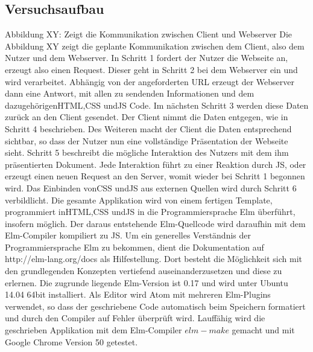 \subsection{Versuchsaufbau}
\label{sec:Versuchsaufbau}
Abbildung XY: Zeigt die Kommunikation zwischen Client und Webserver
Die Abbildung XY zeigt die geplante Kommunikation zwischen dem Client, also dem Nutzer und dem Webserver.
In Schritt 1 fordert der Nutzer die Webseite an, erzeugt also einen Request. Dieser geht in Schritt 2 bei dem Webserver ein und wird verarbeitet. Abhängig von der angeforderten URL erzeugt der Webserver dann eine Antwort, mit allen zu sendenden Informationen und dem dazugehörigen\ac{HTML},\ac{CSS} und\ac{JS} Code. Im nächsten Schritt 3 werden diese Daten zurück an den Client gesendet. Der Client nimmt die Daten entgegen, wie in Schritt 4 beschrieben. Des Weiteren macht der Client die Daten entsprechend sichtbar, so dass der Nutzer nun eine vollständige Präsentation der Webseite sieht. Schritt 5 beschreibt die mögliche Interaktion des Nutzers mit dem ihm präsentierten Dokument. Jede Interaktion führt zu einer Reaktion durch \ac{JS}, oder erzeugt einen neuen Request an den Server, womit wieder bei Schritt 1 begonnen wird. Das Einbinden von\ac{CSS} und\ac{JS} aus externen Quellen wird durch Schritt 6 verbildlicht.
Die gesamte Applikation wird von einem fertigen Template, programmiert in\ac{HTML},\ac{CSS} und\ac{JS} in die Programmiersprache Elm überführt, insofern möglich. Der daraus entstehende Elm-Quellcode wird daraufhin mit dem Elm-Compiler kompiliert zu \ac{JS}.
Um ein generelles Verständnis der Programmiersprache Elm zu bekommen, dient die Dokumentation auf http://elm-lang.org/docs als Hilfestellung. Dort besteht die Möglichkeit sich mit den grundlegenden Konzepten vertiefend auseinanderzusetzen und diese zu erlernen.
Die zugrunde liegende Elm-Version ist 0.17 und wird unter Ubuntu 14.04 64bit installiert. Als Editor wird Atom mit mehreren Elm-Plugins verwendet, so dass der geschriebene Code automatisch beim Speichern formatiert und durch den Compiler auf Fehler überprüft wird.
Lauffähig wird die geschrieben Applikation mit dem Elm-Compiler $elm-make$ gemacht und mit Google Chrome Version 50 getestet.
